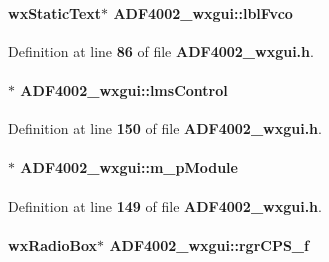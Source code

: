 \paragraph[{lbl\+Fvco}]{\setlength{\rightskip}{0pt plus 5cm}wx\+Static\+Text$\ast$ A\+D\+F4002\+\_\+wxgui\+::lbl\+Fvco}\label{classADF4002__wxgui_a6b4cb4e31fdc58185eccf6a92ab38f98}


Definition at line {\bf 86} of file {\bf A\+D\+F4002\+\_\+wxgui.\+h}.

\paragraph[{lms\+Control}]{$\ast$ A\+D\+F4002\+\_\+wxgui\+::lms\+Control\hspace{0.3cm}{\ttfamily [private]}}\label{classADF4002__wxgui_a634871df4e5b129770eb66c3d98f6948}


Definition at line {\bf 150} of file {\bf A\+D\+F4002\+\_\+wxgui.\+h}.

\paragraph[{m\+\_\+p\+Module}]{$\ast$ A\+D\+F4002\+\_\+wxgui\+::m\+\_\+p\+Module\hspace{0.3cm}{\ttfamily [private]}}\label{classADF4002__wxgui_a72cefaa09f5274dd86e85fd719e6d5eb}


Definition at line {\bf 149} of file {\bf A\+D\+F4002\+\_\+wxgui.\+h}.

\paragraph[{rgr\+C\+P\+S\+\_\+f}]{\setlength{\rightskip}{0pt plus 5cm}wx\+Radio\+Box$\ast$ A\+D\+F4002\+\_\+wxgui\+::rgr\+C\+P\+S\+\_\+f}\label{classADF4002__wxgui_aafd430357469a3f1157ca6de0bbaa737}


